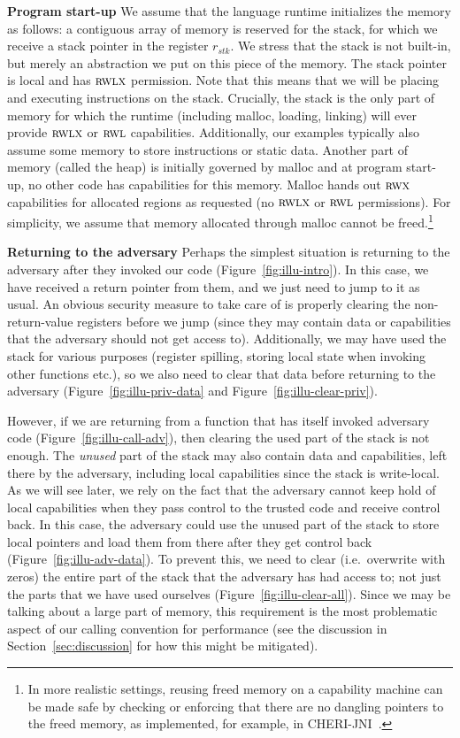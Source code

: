 \documentclass[format=acmsmall, review=true, screen=true]{acmart}
\renewcommand{\figurename}{Figure}
\renewcommand{\sectionname}{Section}
\newcommand{\var}[1]{\mathit{#1}}
\newcommand{\stk}{\var{stk}}
\newcommand{\plainperm}[1]{\textsc{#1}}
\newcommand{\rwx}{\plainperm{rwx}}
\newcommand{\readwritel}{\plainperm{rwl}}
\newcommand{\rwl}{\readwritel}
\newcommand{\rwlx}{\plainperm{rwlx}}
\newcommand{\itoplas}[1]%
    {{\color{OliveGreen} #1}}
\begin{document}
\textbf{Program start-up} We assume that the language runtime initializes the
memory as follows: a contiguous array of memory is reserved for the stack, for
which we receive a stack pointer in the register $r_\stk$. We stress that
the stack is not built-in, but merely an abstraction we put on this piece of the
memory. The stack pointer is local and has $\rwlx$ permission. Note that this
means that we will be placing and executing instructions on the stack.
Crucially, the stack is the only part of memory for which the runtime (including
malloc, loading, linking) will ever provide $\rwlx$ or $\rwl$ capabilities.
Additionally, our examples typically also assume some memory to store
instructions or static data. Another part of memory (called the heap) is
initially governed by malloc and at program start-up, no other code has
capabilities for this memory. Malloc hands out $\rwx$ capabilities for allocated
regions as requested (no $\rwlx$ or $\rwl$ permissions). For simplicity, we
assume that memory allocated through malloc cannot be freed.\footnote{In more realistic settings, reusing freed memory on a capability machine can be made safe by checking or enforcing that there are no dangling pointers to the freed memory, as implemented, for example, in CHERI-JNI~\citep{chisnall_cheri_2017}. }

\textbf{Returning to the adversary} Perhaps the simplest situation is returning
to the adversary after they invoked our code \itoplas{(\figurename~\ref{fig:illu-intro})}. In this case, we have received a
return pointer from them, and we just need to jump to it as usual. An obvious
security measure to take care of is properly clearing the non-return-value
registers before we jump (since they may contain data or capabilities that the
adversary should not get access to). Additionally, we may have used the stack
for various purposes (register spilling, storing local state when invoking other
functions etc.), so we also need to clear that data before returning to the
adversary \itoplas{(\figurename~\ref{fig:illu-priv-data} and \figurename~\ref{fig:illu-clear-priv})}.

However, if we are returning from a function that has itself invoked adversary
code \itoplas{(\figurename~\ref{fig:illu-call-adv})}, then clearing the used part of the stack is not enough. The \emph{unused}
part of the stack may also contain data and capabilities, left there by the
adversary, including local capabilities since the stack is write-local. As we
will see later, we rely on the fact that the adversary cannot keep hold of local
capabilities when they pass control to the trusted code and receive control
back. In this case, the adversary could use the unused part of the stack to
store local pointers and load them from there after they get control back
\itoplas{(\figurename~\ref{fig:illu-adv-data})}. To
prevent this, we need to clear (i.e.\ overwrite with zeros) the entire part of
the stack that the adversary has had access to; not just the parts that we have
used ourselves \itoplas{(\figurename~\ref{fig:illu-clear-all})}. Since we may be talking about a large part of memory, this
requirement is the most problematic aspect of our calling convention for
performance (see the discussion in \sectionname~\ref{sec:discussion} for how this might be
mitigated).
\end{document}
